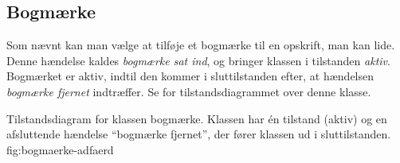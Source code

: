 \subsection{Bogmærke}
Som nævnt kan man vælge at tilføje et bogmærke til en opskrift, man kan lide. Denne hændelse kaldes \textit{bogmærke sat ind}, og bringer klassen i tilstanden \textit{aktiv}. Bogmærket er aktiv, indtil den kommer i sluttilstanden efter, at hændelsen \textit{bogmærke fjernet} indtræffer. Se  for tilstandsdiagrammet over denne klasse.

  {Tilstandsdiagram for klassen bogmærke. Klassen har én tilstand (aktiv) og en afsluttende hændelse ``bogmærke fjernet'', der fører klassen ud i sluttilstanden.}
  {fig:bogmaerke-adfaerd}
